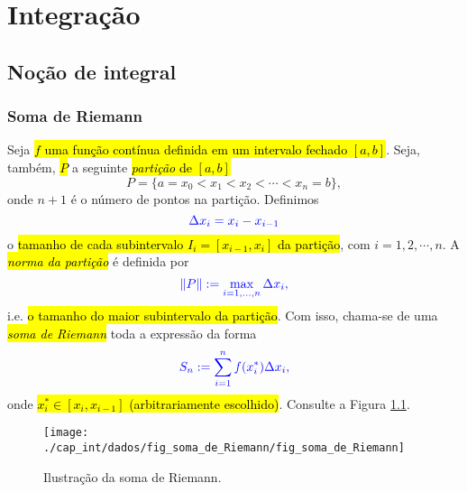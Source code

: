 
\chapter{Integração}\label{cap_int}
\thispagestyle{fancy}

\section{Noção de integral}\label{cap_int_sec_nocaoint}

\subsection{Soma de Riemann}

Seja \hl{$f$ uma função contínua definida em um intervalo fechado $[a, b]$}. Seja, também, \hl{$P$} a seguinte \hl{\emph{partição} de $[a, b]$}
\begin{equation}
  P = \{a=x_0<x_1<x_2<\cdots<x_n=b\},
\end{equation}
onde $n+1$ é o número de pontos na partição. Definimos
\begin{equation}
  \color{blue}\Delta x_i = x_{i} - x_{i-1}
\end{equation}
o \hl{tamanho de cada subintervalo $I_{i} = [x_{i-1}, x_{i}]$ da partição}, com $i = 1, 2, \cdots, n$. A \hl{\emph{norma da partição}} é definida por
\begin{equation}
  \color{blue}\|P\| := \max_{i=1, \dotsc, n} \Delta x_i,
\end{equation}
i.e. \hl{o tamanho do maior subintervalo da partição}. Com isso, chama-se de uma \hl{\emph{soma de Riemann}}{\riemann} toda a expressão da forma
\begin{equation}\color{blue}S_n := \sum_{i=1}^n f(x_i^*)\Delta x_i,
\end{equation}
onde \hl{$x_i^*\in [x_i, x_{i-1}]$ (arbitrariamente escolhido)}. Consulte a Figura \ref{fig:soma_de_Riemann}.

\begin{figure}[H]
  \centering
  \texttt{[image: ./cap\_int/dados/fig\_soma\_de\_Riemann/fig\_soma\_de\_Riemann]}
  \caption{Ilustração da soma de Riemann.}
  \label{fig:soma_de_Riemann}
\end{figure}

